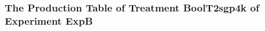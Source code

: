  \begin{frame}
 \fontsize{8pt}{9pt}\selectfont
 \frametitle{ The Production Table of Treatment BoolT2sgp4k of Experiment ExpB }

 \label{ExpBGrammarTable013.tex}  
 \end{frame}


